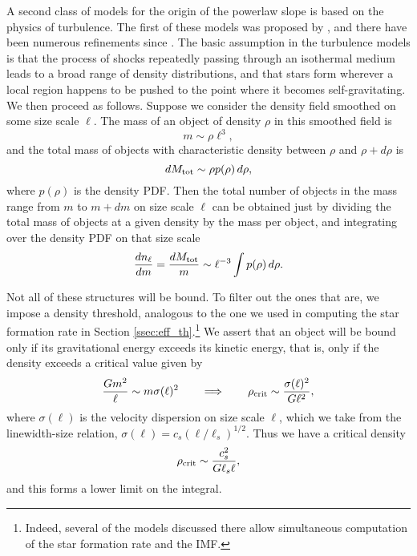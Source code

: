 A second class of models for the origin of the powerlaw slope is based on the physics of turbulence. The first of these models was proposed by \citet{padoan97a}, and there have been numerous refinements since \citep[e.g.,][]{padoan02a, padoan07a, hennebelle08b, hennebelle09a, hopkins12e, hopkins12d}. The basic assumption in the turbulence models is that the process of shocks repeatedly passing through an isothermal medium leads to a broad range of density distributions, and that stars form wherever a local region happens to be pushed to the point where it becomes self-gravitating. We then proceed as follows. Suppose we consider the density field smoothed on some size scale $\ell$. The mass of an object of density $\rho$ in this smoothed field is
\begin{equation}
m \sim \rho \ell^3,
\end{equation}
and the total mass of objects with characteristic density between $\rho$ and $\rho+d\rho$ is
\begin{equation}
dM_{\rm tot} \sim \rho p(\rho) \,d\rho,
\end{equation}
where $p(\rho)$ is the density PDF. Then the total number of objects in the mass range from $m$ to $m+dm$ on size scale $\ell$ can be obtained just by dividing the total mass of objects at a given density by the mass per object, and integrating over the density PDF on that size scale
\begin{equation}
\frac{dn_\ell}{dm} = \frac{dM_{\rm tot}}{m} \sim  \ell^{-3} \int p(\rho) \,d\rho.
\end{equation}

Not all of these structures will be bound. To filter out the ones that are, we impose a density threshold, analogous to the one we used in computing the star formation rate in Section \ref{ssec:eff_th}.\footnote{Indeed, several of the models discussed there allow simultaneous computation of the star formation rate and the IMF.} We assert that an object will be bound only if its gravitational energy exceeds its kinetic energy, that is, only if the density exceeds a critical value given by
\begin{equation}
\frac{Gm^2}{\ell} \sim m \sigma(\ell)^2
\qquad\Longrightarrow\qquad
\rho_{\rm crit} \sim \frac{\sigma(\ell)^2}{G \ell^2},
\end{equation}
where $\sigma(\ell)$ is the velocity dispersion on size scale $\ell$, which we take from the linewidth-size relation, $\sigma(\ell) = c_s (\ell/\ell_s)^{1/2}$. Thus we have a critical density
\begin{equation}
\rho_{\rm crit} \sim \frac{c_s^2}{G \ell_s \ell},
\end{equation}
and this forms a lower limit on the integral.

